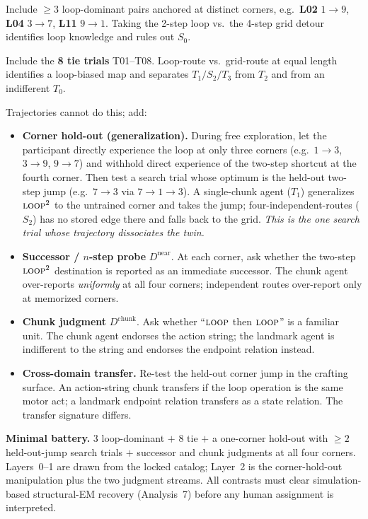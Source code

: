 \documentclass[10pt]{article}
\begin{document}
\begin{description}[style=nextline,leftmargin=1.4em]
\item[Layer 0 --- loop competence ( from the catalog).] Include $\ge 3$ loop-dominant
pairs anchored at distinct corners, e.g.\ \textbf{L02} $1\!\to\!9$, \textbf{L04}
$3\!\to\!7$, \textbf{L11} $9\!\to\!1$. Taking the 2-step loop vs.\ the 4-step grid detour
identifies loop knowledge and rules out $S_0$.
\item[Layer 1 --- loop bias (from the catalog).] Include the \textbf{8 tie trials}
T01--T08. Loop-route vs.\ grid-route at equal length identifies a loop-biased map and
separates $T_1/S_2/T_3$ from $T_2$ and from an indifferent $T_0$.
\item[Layer 2 --- chunk vs.\ landmark (requires a manipulation, not just catalog trials).]
Trajectories cannot do this; add:
\begin{itemize}
\item \textbf{Corner hold-out (generalization).} During free exploration, let the
participant directly experience the loop at only three corners (e.g.\ $1\!\to\!3$,
$3\!\to\!9$, $9\!\to\!7$) and withhold direct experience of the two-step shortcut at the
fourth corner. Then test a search trial whose optimum is the held-out two-step jump (e.g.\
$7\!\to\!3$ via $7\!\to\!1\!\to\!3$). A single-chunk agent ($T_1$) generalizes
$\textsc{loop}^2$ to the untrained corner and takes the jump; four-independent-routes
($S_2$) has no stored edge there and falls back to the grid. \emph{This is the one search
trial whose trajectory dissociates the twin.}
\item \textbf{Successor / $n$-step probe} $D^{\mathrm{near}}$. At each corner, ask whether
the two-step $\textsc{loop}^2$ destination is reported as an immediate successor. The chunk
agent over-reports \emph{uniformly} at all four corners; independent routes over-report
only at memorized corners.
\item \textbf{Chunk judgment} $D^{\mathrm{chunk}}$. Ask whether ``$\textsc{loop}$ then
$\textsc{loop}$'' is a familiar unit. The chunk agent endorses the action string; the
landmark agent is indifferent to the string and endorses the endpoint relation instead.
\item \textbf{Cross-domain transfer.} Re-test the held-out corner jump in the crafting
surface. An action-string chunk transfers if the loop operation is the same motor act; a
landmark endpoint relation transfers as a state relation. The transfer signature differs.
\end{itemize}
\end{description}
\noindent\textbf{Minimal battery.} $3$ loop-dominant $+$ $8$ tie $+$ a one-corner hold-out
with $\ge 2$ held-out-jump search trials $+$ successor and chunk judgments at all four
corners. Layers~0--1 are drawn from the locked catalog; Layer~2 is the corner-hold-out
manipulation plus the two judgment streams. All contrasts must clear simulation-based
structural-EM recovery (Analysis~7) before any human assignment is interpreted.
\end{document}
